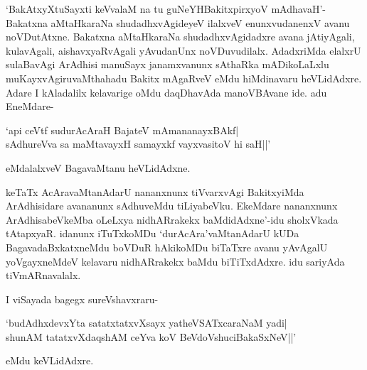`BakAtxyXtuSayxti keVvalaM na tu guNeYHBakitxpirxyoV mAdhavaH'-Bakatxna aMtaHkaraNa shudadhxvAgideyeV ilalxveV enunxvudanenxV avanu noVDutAtxne. Bakatxna aMtaHkaraNa shudadhxvAgidadxre avana jAtiyAgali, kulavAgali, aishavxyaRvAgali yAvudanUnx noVDuvudilalx. AdadxriMda elalxrU sulaBavAgi ArAdhisi manuSayx janamxvanunx sAthaRka mADikoLaLxlu muKayxvAgiruvaMthahadu Bakitx mAgaRveV eMdu hiMdinavaru heVLidAdxre. Adare I kAladalilx kelavarige oMdu daqDhavAda manoVBAvane ide. adu EneMdare-

\begin{shloka}
`api ceVtf sudurAcAraH BajateV mAmananayxBAkf|\\
sAdhureVva sa maMtavayxH samayxkf vayxvasitoV hi saH||'
\end{shloka}

eMdalalxveV BagavaMtanu heVLidAdxne.

keTaTx AcAravaMtanAdarU nananxnunx tiVvarxvAgi BakitxyiMda ArAdhisidare avananunx sAdhuveMdu tiLiyabeVku. EkeMdare nananxnunx ArAdhisabeVkeMba oLeLxya nidhARrakekx baMdidAdxne'-idu sholxVkada tAtapxyaR. idanunx iTuTxkoMDu `durAcAra'vaMtanAdarU kUDa BagavadaBxkatxneMdu boVDuR hAkikoMDu biTaTxre avanu yAvAgalU yoVgayxneMdeV kelavaru nidhARrakekx baMdu biTiTxdAdxre. idu sariyAda tiVmARnavalalx.

I viSayada bagegx sureVshavxraru-

\begin{shloka}
`budAdhxdevxYta satatxtatxvXsayx yatheVSATxcaraNaM yadi|\\
shunAM tatatxvXdaqshAM ceYva koV BeVdoV\s shuciBakaSxNeV||'
\end{shloka}

eMdu keVLidAdxre.

